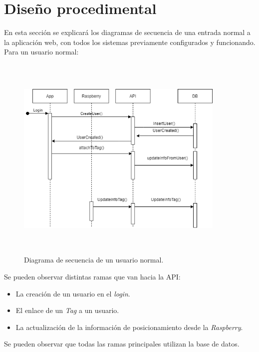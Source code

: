 \section{Diseño procedimental}
En esta sección se explicará los diagramas de secuencia de una entrada normal a la aplicación web, con todos los sistemas previamente configurados y funcionando.
Para un usuario normal:

\FloatBarrier
\begin{figure}[h]
    \centering
    \includegraphics[width=10cm,height=10cm,keepaspectratio]{img/Diagrama procedimental Usuario.drawio (1).png}
    \caption{Diagrama de secuencia de un usuario normal.}
    \label{fig:diagram_seceunce_user}
\end{figure}
\FloatBarrier
Se pueden observar distintas ramas que van hacia la API:
\begin{itemize}
    \item La creación de un usuario en el \textit{login}.
    \item El enlace de un \textit{Tag} a un usuario.
    \item La actualización de la información de posicionamiento desde la \textit{Raspberry}.
\end{itemize}

Se pueden observar que todas las ramas principales utilizan la base de datos.



